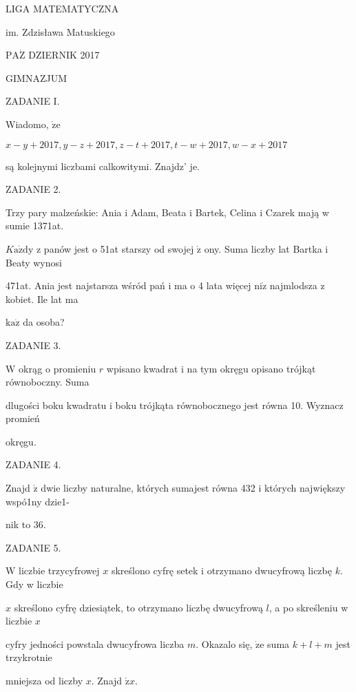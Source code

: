 \documentclass[a4paper,12pt]{article}
\begin{document}
LIGA MATEMATYCZNA

im. Zdzisława Matuskiego

$\mathrm{P}\mathrm{A}\dot{\mathrm{Z}}$ DZIERNIK 2017

GIMNAZJUM

ZADANIE I.

Wiadomo, $\dot{\mathrm{z}}\mathrm{e}$

$x-y+2017,y-z+2017,z-t+2017,t-w+2017,w-x+2017$

są kolejnymi liczbami calkowitymi. Znajdz' je.

ZADANIE 2.

Trzy pary malzeńskie: Ania i Adam, Beata i Bartek, Celina i Czarek mają w sumie 1371at.

$K\mathrm{a}\dot{\mathrm{z}}\mathrm{d}\mathrm{y}$ z panów jest o 51at starszy od swojej $\dot{\mathrm{z}}$ ony. Suma liczby lat Bartka i Beaty wynosi

471at. Ania jest najstarsza wśród pań i ma o 4 lata więcej $\mathrm{n}\mathrm{i}\dot{\mathrm{z}}$ najmlodsza z kobiet. Ile lat ma

$\mathrm{k}\mathrm{a}\dot{\mathrm{z}}$ da osoba?

ZADANIE 3.

$\mathrm{W}$ okrąg o promieniu $r$ wpisano kwadrat i na tym okręgu opisano trójkąt równoboczny. Suma

dlugości boku kwadratu i boku trójkąta równobocznego jest równa 10. Wyznacz promień

okręgu.

ZADANIE 4.

Znajd $\acute{\mathrm{z}}$ dwie liczby naturalne, których sumajest równa 432 i których największy wspó1ny dzie1-

nik to 36.

ZADANIE 5.

$\mathrm{W}$ liczbie trzycyfrowej $x$ skreślono cyfrę setek i otrzymano dwucyfrową liczbę $k$. Gdy w liczbie

$x$ skreślono cyfrę dziesiątek, to otrzymano liczbę dwucyfrową $l$, a po skreśleniu w liczbie $x$

cyfry jedności powstala dwucyfrowa liczba $m$. Okazalo się, $\dot{\mathrm{z}}\mathrm{e}$ suma $k+l+m$ jest trzykrotnie

mniejsza od liczby $x.$ Znajd $\acute{\mathrm{z}}x.$
\end{document}
